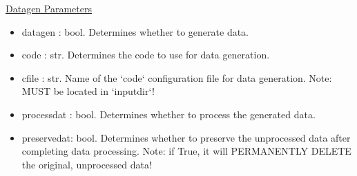 \documentclass[letterpaper, 12pt]{article}
\begin{document}
\noindent \underline{Datagen Parameters}
\begin{itemize}
\item datagen    : bool. Determines whether to generate data.
\item code       : str.  Determines the code to use for data generation.
\item cfile      : str.  Name of the `code` configuration file for data generation.
                   Note: MUST be located in `inputdir`!
\item processdat : bool. Determines whether to process the generated data.
\item preservedat: bool. Determines whether to preserve the unprocessed data after 
                   completing data processing.
                   Note: if True, it will PERMANENTLY DELETE the original, 
                         unprocessed data!
\end{itemize}
\end{document}
